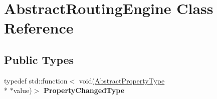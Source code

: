 \hypertarget{classAbstractRoutingEngine}{\section{Abstract\+Routing\+Engine Class Reference}
\label{classAbstractRoutingEngine}
}
\subsection*{Public Types}
\begin{DoxyCompactItemize}
\item 
\hypertarget{classAbstractRoutingEngine_aea584dbb4853b86a3020783bfe9e0608}{typedef std\+::function$<$ void(\hyperlink{classAbstractPropertyType}{Abstract\+Property\+Type} \\*
$\ast$value)$>$ {\bfseries Property\+Changed\+Type}}\label{classAbstractRoutingEngine_aea584dbb4853b86a3020783bfe9e0608}

\end{DoxyCompactItemize}
